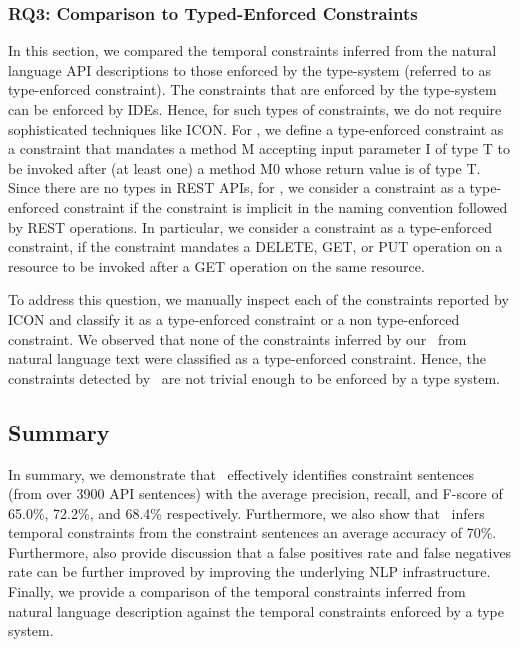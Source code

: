 \subsubsection{RQ3: Comparison to Typed-Enforced Constraints}

In this section, we compared the temporal constraints inferred from the natural language API descriptions to those enforced by the type-system (referred to as type-enforced constraint). The constraints that are enforced by the type-system can be enforced by IDEs. Hence, for such types of constraints, we do not require sophisticated techniques like ICON. 
For , we define a type-enforced constraint as a constraint that mandates a method M accepting input parameter I of type T to be invoked after (at least one) a method M0 whose return value is of type T. 
Since there are no types in REST APIs, for , we consider a constraint as a type-enforced constraint if the constraint is implicit in the  naming convention followed by REST operations. In particular, we consider a constraint as a type-enforced constraint, if the constraint mandates a DELETE, GET, or PUT operation on a resource to be invoked after a GET operation on the same resource. 

To address this question, we manually inspect each of the constraints reported by ICON and classify it as a type-enforced constraint or a non type-enforced constraint. 
We observed that none of the constraints inferred by our \tool\ from natural language text were classified as a type-enforced constraint. Hence, the constraints detected by \tool\ are not trivial enough to be enforced by a type system.




\subsection{Summary}
\label{sub:summary}

In summary, we demonstrate that \tool\ effectively identifies constraint sentences (from over 3900 API sentences) with the average precision, recall, and F-score of 65.0\%, 72.2\%, and 68.4\% respectively. Furthermore, we also show that \tool\ infers temporal constraints from the constraint sentences an average accuracy of 70\%. Furthermore, also provide discussion that a false positives rate and false negatives rate can be further improved by improving the underlying NLP infrastructure. Finally, we provide a comparison of the temporal constraints inferred from natural language description against the temporal constraints enforced by a type system. 


